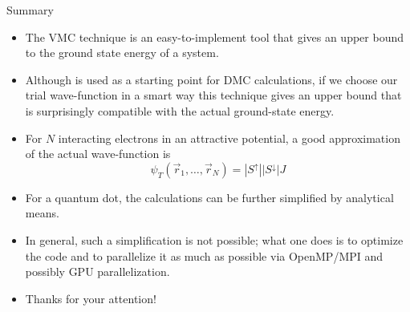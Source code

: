 \documentclass[10pt, compress, usetitleprogressbar, protectframetitle, handout]{beamer}
\begin{document}
\begin{frame}{Summary}

	\begin{itemize}[<+->]
		\item The VMC technique is an easy-to-implement tool that gives an upper bound to the ground state energy of a system.
		\item Although is used as a starting point for DMC calculations, if we choose our trial wave-function in a smart way this technique gives an upper bound that is surprisingly compatible with the actual ground-state energy.
		\item For $N$ interacting electrons in an attractive potential, a good approximation of the actual wave-function is
		\begin{equation*}
			\psi_T(\vec{r}_1,\ldots,\vec{r}_N) = |S^{\uparrow}||S^{\downarrow}|J
		\end{equation*}
		\item For a quantum dot, the calculations can be further simplified by analytical means.
		\item In general, such a simplification is not possible; what one does is to optimize the code and to parallelize it as much as possible via OpenMP/MPI and possibly GPU parallelization.
		\item \alert{Thanks for your attention!}
	\end{itemize}

\end{frame}

\end{document}
